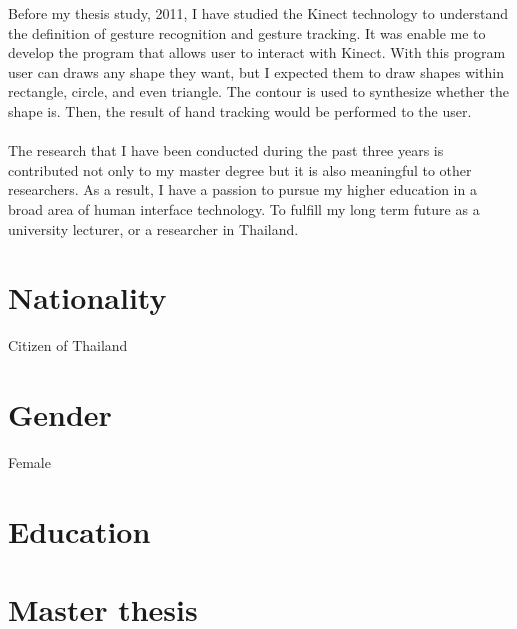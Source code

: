 \documentclass[11pt,a4paper,roman]{moderncv}        %
\begin{document}
Before my thesis study, 2011, I have studied the Kinect technology to understand the definition of gesture recognition and gesture tracking. It was enable me to develop the program that allows user to interact with Kinect. With this program user can draws any shape they want, but I expected them to draw shapes within rectangle, circle, and even triangle. The contour is used to synthesize whether the shape is. Then, the result of hand tracking would be performed to the user. 
\\
\\
The research that I have been conducted during the past three years is contributed not only to my master degree but it is also meaningful to other researchers. As a result, I have a passion to pursue my higher education in a broad area of human interface technology. To fulfill my long term future as a university lecturer, or a researcher in Thailand. 
		

\clearpage

\makecvtitle
\section{Nationality}
Citizen of Thailand

\section{Gender}
Female

\section{Education}

\section{Master thesis}
\end{document}
